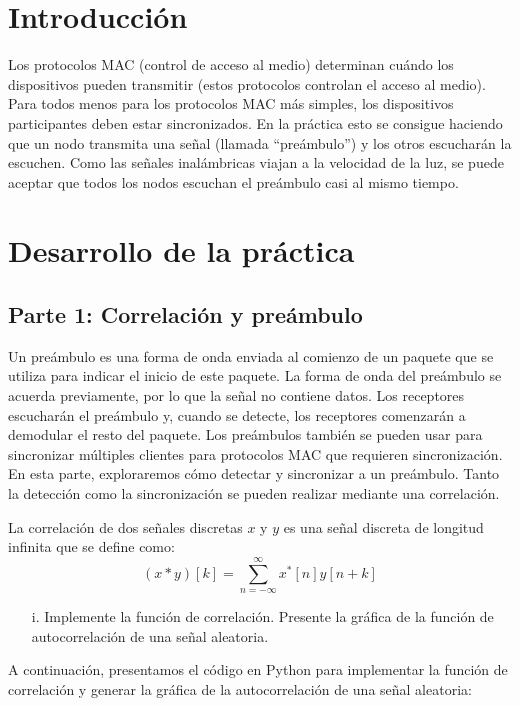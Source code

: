 \documentclass[letterpaper,12pt,oneside]{article}
\begin{document}
\section{Introducción}
Los protocolos MAC (control de acceso al medio) determinan cuándo los dispositivos pueden transmitir (estos protocolos controlan el acceso al medio). Para todos menos para los protocolos MAC más simples, los dispositivos participantes deben estar sincronizados. En la práctica esto se consigue haciendo que un nodo transmita una señal (llamada “preámbulo”) y los otros escucharán la escuchen. Como las señales inalámbricas viajan a la velocidad de la luz, se puede aceptar que todos los nodos escuchan el preámbulo casi al mismo tiempo.

\section{Desarrollo de la práctica}

\subsection{Parte 1: Correlación y preámbulo}
Un preámbulo es una forma de onda enviada al comienzo de un paquete que se utiliza para indicar el inicio de este paquete. La forma de onda del preámbulo se acuerda previamente, por lo que la señal no contiene datos. Los receptores escucharán el preámbulo y, cuando se detecte, los receptores comenzarán a demodular el resto del paquete. Los preámbulos también se pueden usar para sincronizar múltiples clientes para protocolos MAC que requieren sincronización. En esta parte, exploraremos cómo detectar y sincronizar a un preámbulo. Tanto la detección como la sincronización se pueden realizar mediante una correlación.

La correlación de dos señales discretas \(x\) y \(y\) es una señal discreta de longitud infinita que se define como:
\[
(x * y)[k] = \sum_{n=-\infty}^{\infty} x^*[n] y[n + k]
\]

\begin{itemize}
    \item[i.] Implemente la función de correlación. Presente la gráfica de la función de autocorrelación de una señal aleatoria.
\end{itemize}

A continuación, presentamos el código en Python para implementar la función de correlación y generar la gráfica de la autocorrelación de una señal aleatoria:
\end{document}
